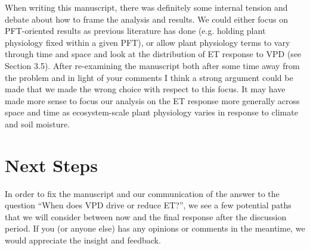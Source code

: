 When writing this manuscript, there was definitely some internal
tension and debate about how to frame the analysis and results. We
could either focus on PFT-oriented results as previous literature has
done (e.g. holding plant physiology fixed within a given PFT), or
allow plant physiology terms to vary through time and space and look
at the distribution of ET response to VPD (see Section 3.5). After
re-examining the manuscript both after some time away from the
problem and in light of your comments I think a strong argument could
be made that we made the wrong choice with respect to this focus. It
may have made more sense to focus our analysis on the ET response more
generally across space and time as ecosystem-scale plant physiology
varies in response to climate and soil moisture.

\section{Next Steps}

In order to fix the manuscript and our communication of the answer to
the question ``When does VPD drive or reduce ET?'', we see a few
potential paths that we will consider between now and the final
response after the discussion period. If you (or anyone else) has any
opinions or comments in the meantime, we would appreciate the insight
and feedback.

